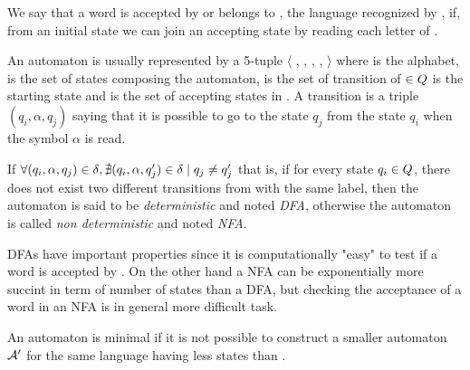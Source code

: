 We say that a word \word{} is accepted by \automaton{} or belongs to \langA{}, the language recognized by \automaton{}, if, from an initial state we can join an accepting state by reading each letter of \word{}.

\begin{notation}
    An automaton \automaton{} is usually represented by a 5-tuple $\langle$ \alphabet{}, \states{}, \transition{}, \qzero{}, \qend{} $\rangle$ where \alphabet{} is the alphabet, \states{} is the set of states composing the automaton, \transition{} is the set of transition of \automaton{} \qzero{} $\in Q{}$ is the starting state and \qend{} is the set of accepting states in \states{}. A transition \transition{} is a triple $(q_i, \alpha, q_j)$ saying that it is possible to go to the state $q_j$ from the state $q_i$ when the symbol $\alpha$ is read.
\end{notation}

\begin{definition}
    If $\forall (q_i, \alpha, q_j) \in \delta{}, \nexists (q_i, \alpha, q_j') \in \delta{} \mid q_j \neq q_j'$ that is, if for every state $q_i \in Q{}$, there does not exist two different transitions from \qi{} with the same label, then the automaton is said to be \textit{deterministic} and noted \textit{DFA}, otherwise the automaton is called \textit{non deterministic} and noted \textit{NFA}.
\end{definition}

DFAs have important properties since it is computationally "easy" to test if a word is accepted by \automaton{}. On the other hand a NFA can be exponentially more succint in term of number of states than a DFA, but checking the acceptance of a word in an NFA is in general more difficult task.

\begin{definition}
    An automaton \automaton{} is minimal if it is not possible to construct a smaller automaton $\mathcal{A}{}'$ for the same language having less states than \automaton{}.
\end{definition}

